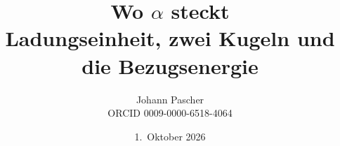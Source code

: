 \documentclass[11pt,a4paper]{report}
\title{Wo $\alpha$ steckt\\[0.5em]
  \large Ladungseinheit, zwei Kugeln und die Bezugsenergie}
\date{1.~Oktober 2026}
\author{Johann Pascher\\\small ORCID 0009-0000-6518-4064}
\begin{document}
\renewcommand{\thechapter}{}
\renewcommand{\thesection}{\arabic{section}}
\maketitle
\tableofcontents

\end{document}
